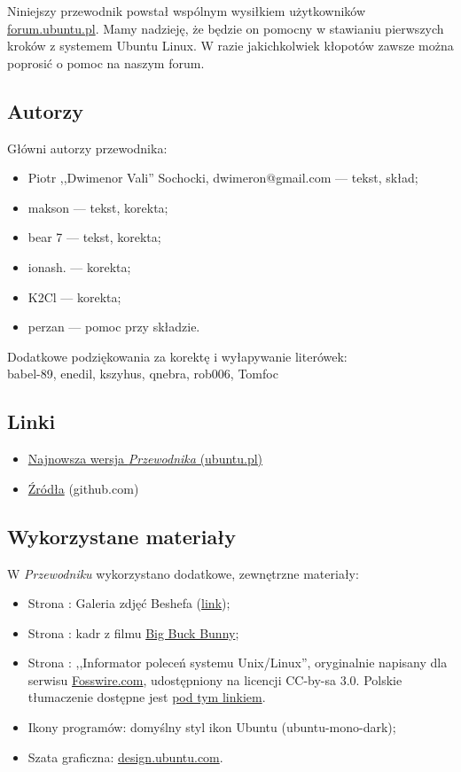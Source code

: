 Niniejszy przewodnik powstał wspólnym wysiłkiem użytkowników \href{http://ubuntu.pl/forum/}{forum.ubuntu.pl}. Mamy nadzieję, że będzie on pomocny w stawianiu pierwszych kroków z systemem Ubuntu Linux. W razie jakichkolwiek kłopotów zawsze można poprosić o pomoc na naszym forum.

\subsection{Autorzy}
Główni autorzy przewodnika:
\begin{itemize}
\item Piotr ,,Dwimenor Vali'' Sochocki, dwimeron@gmail.com --- tekst, skład;
\item makson --- tekst, korekta;
\item bear 7 --- tekst, korekta;
\item ionash. --- korekta;
\item K2Cl --- korekta;
\item perzan --- pomoc przy składzie.
\end{itemize}

Dodatkowe podziękowania za korektę i wyłapywanie literówek:\\
babel-89, enedil, kszyhus, qnebra, rob006, Tomfoc

\subsection{Linki}
\begin{itemize}
\item \href{http://ubuntu.pl/dokumenty/Przewodnik_Ubuntu_14.04_LTS_Trusty_Tahr.pdf}{Najnowsza wersja \textit{Przewodnika} (ubuntu.pl)}
\item \href{https://github.com/Dwimenor/Przewodnik-Ubuntu-14.04-LTS-Trusty-Tahr}{Źródła} (github.com)
\end{itemize}

\subsection{Wykorzystane materiały}
W \textit{Przewodniku} wykorzystano dodatkowe, zewnętrzne materiały:
\begin{itemize}
\item Strona \pageref{shotwell}: Galeria zdjęć Beshefa (\href{https://www.flickr.com/photos/sharif/sets/72157600223985436/}{link});
\item Strona \pageref{totem}: kadr z filmu \href{http://www.bigbuckbunny.org}{Big Buck Bunny};
\item Strona \pageref{polecenia}: ,,Informator poleceń systemu Unix/Linux'', oryginalnie napisany dla serwisu \href{http://fosswire.com/}{Fosswire.com}, udostępniony na licencji CC-by-sa 3.0. Polskie tłumaczenie dostępne jest \href{http://czytelnia.ubuntu.pl/index.php/2012/02/24/wydrukuj-i-powies-kolo-monitora-informator-polecen-systemu-unixlinux/}{pod tym linkiem}.
\item Ikony programów: domyślny styl ikon Ubuntu (ubuntu-mono-dark);
\item Szata graficzna: \href{http://design.ubuntu.com/}{design.ubuntu.com}.
\end{itemize}


